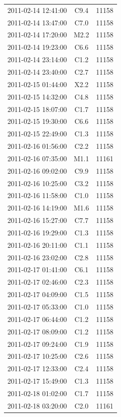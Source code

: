 \documentclass[referee,a4paper,12pt]{swsc}
\begin{document}
\begin{linenumbers}
\begin{longtable}{c|c|c}
		2011-02-14 12:41:00 & C9.4 & 11158 \\ 
		2011-02-14 13:47:00 & C7.0 & 11158 \\ 
		2011-02-14 17:20:00 & M2.2 & 11158 \\ 
		2011-02-14 19:23:00 & C6.6 & 11158 \\ 
		2011-02-14 23:14:00 & C1.2 & 11158 \\ 
		2011-02-14 23:40:00 & C2.7 & 11158 \\ 
		2011-02-15 01:44:00 & X2.2 & 11158 \\ 
		2011-02-15 14:32:00 & C4.8 & 11158 \\ 
		2011-02-15 18:07:00 & C1.7 & 11158 \\ 
		2011-02-15 19:30:00 & C6.6 & 11158 \\ 
		2011-02-15 22:49:00 & C1.3 & 11158 \\ 
		2011-02-16 01:56:00 & C2.2 & 11158 \\ 
		2011-02-16 07:35:00 & M1.1 & 11161 \\ 
		2011-02-16 09:02:00 & C9.9 & 11158 \\ 
		2011-02-16 10:25:00 & C3.2 & 11158 \\ 
		2011-02-16 11:58:00 & C1.0 & 11158 \\ 
		2011-02-16 14:19:00 & M1.6 & 11158 \\ 
		2011-02-16 15:27:00 & C7.7 & 11158 \\ 
		2011-02-16 19:29:00 & C1.3 & 11158 \\ 
		2011-02-16 20:11:00 & C1.1 & 11158 \\ 
		2011-02-16 23:02:00 & C2.8 & 11158 \\ 
		2011-02-17 01:41:00 & C6.1 & 11158 \\ 
		2011-02-17 02:46:00 & C2.3 & 11158 \\ 
		2011-02-17 04:09:00 & C1.5 & 11158 \\ 
		2011-02-17 05:33:00 & C1.0 & 11158 \\ 
		2011-02-17 06:44:00 & C1.2 & 11158 \\ 
		2011-02-17 08:09:00 & C1.2 & 11158 \\ 
		2011-02-17 09:24:00 & C1.9 & 11158 \\ 
		2011-02-17 10:25:00 & C2.6 & 11158 \\ 
		2011-02-17 12:33:00 & C2.4 & 11158 \\ 
		2011-02-17 15:49:00 & C1.3 & 11158 \\ 
		2011-02-18 01:02:00 & C1.7 & 11158 \\ 
		2011-02-18 03:20:00 & C2.0 & 11161 \\ 

\end{longtable}
\end{linenumbers}
\end{document}
